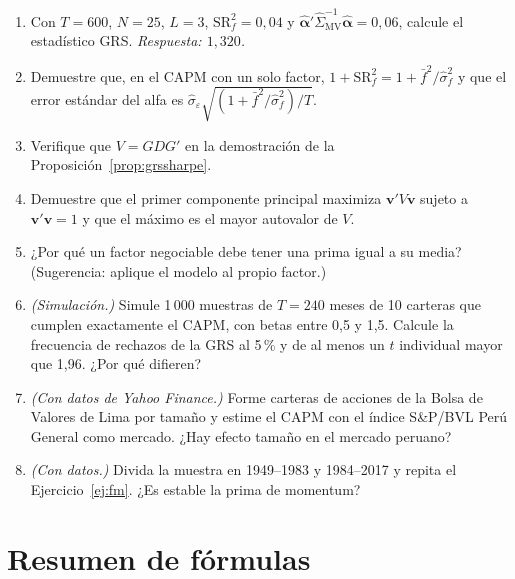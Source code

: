 \begin{enumerate}[label=\textbf{\thechapter.\arabic*},leftmargin=*,itemsep=6pt]
  \item Con $T=600$, $N=25$, $L=3$, $\mathrm{SR}^2_f=0{,}04$ y $\hat{\boldsymbol\alpha}'\hat\Sigma_{\text{MV}}^{-1}\hat{\boldsymbol\alpha}=0{,}06$, calcule el
  estadístico GRS. \textit{Respuesta: $1{,}320$.}

  \item Demuestre que, en el CAPM con un solo factor, $1+\mathrm{SR}^2_f=1+\bar f^2/\hat\sigma_f^2$ y que el error estándar del alfa
  es $\hat\sigma_\varepsilon\sqrt{(1+\bar f^2/\hat\sigma_f^2)/T}$.

  \item Verifique que $V=GDG'$ en la demostración de la Proposición~\ref{prop:grssharpe}.

  \item Demuestre que el primer componente principal maximiza $\mathbf v'V\mathbf v$ sujeto a $\mathbf v'\mathbf v=1$ y que el
  máximo es el mayor autovalor de $V$.

  \item ¿Por qué un factor negociable debe tener una prima igual a su media? (Sugerencia: aplique el modelo al propio factor.)

  \item \emph{(Simulación.)} Simule 1\,000 muestras de $T=240$ meses de 10 carteras que cumplen exactamente el CAPM, con betas
  entre 0,5 y 1,5. Calcule la frecuencia de rechazos de la GRS al 5\,\% y de al menos un $t$ individual mayor que 1,96. ¿Por
  qué difieren?

  \item \emph{(Con datos de Yahoo Finance.)} Forme carteras de acciones de la Bolsa de Valores de Lima por tamaño y estime el
  CAPM con el índice S\&P/BVL Perú General como mercado. ¿Hay efecto tamaño en el mercado peruano?

  \item \emph{(Con datos.)} Divida la muestra en 1949--1983 y 1984--2017 y repita el Ejercicio~\ref{ej:fm}. ¿Es estable la prima de
  momentum?
\end{enumerate}

\section{Resumen de fórmulas}

